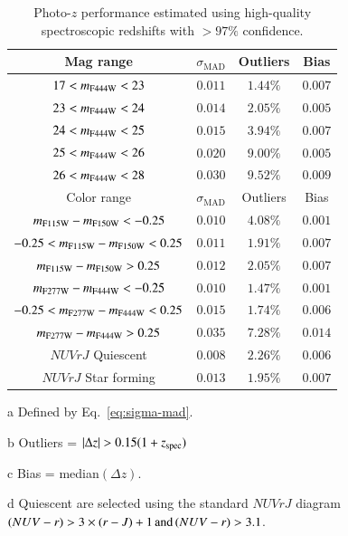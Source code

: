 \documentclass[longauth]{aa}
\begin{document}
\begin{table}[t!]
\begin{threeparttable}
\centering
\caption{Photo-$z$ performance estimated using high-quality spectroscopic redshifts with $>97\%$ confidence.}
\begin{tabular}{c|c|c|c}
\hline
\hline
Mag range & $\sigma_{\text{MAD}}$\tnote{a}  & Outliers\tnote{b} & Bias\tnote{c}  \\
\hline
$17 < m_{\rm F444W} < 23$ & $0.011$ & $1.44\%$ & $0.007$ \\
$23 < m_{\rm F444W} < 24$ & $0.014$ & $2.05\%$ & $0.005$ \\
$24 < m_{\rm F444W} < 25$ & $0.015$ & $3.94\%$ & $0.007$ \\
$25 < m_{\rm F444W} < 26$ & $0.020$ & $9.00\%$ & $0.005$ \\
$26 < m_{\rm F444W} < 28$ & $0.030$ & $9.52\%$ & $0.009$ \\
\hline
\hline
Color range & $\sigma_{\text{MAD}}$\tnote{a}  & Outliers\tnote{b} & 
Bias\tnote{c}  \\
\hline
$m_{\rm F115W} - m_{\rm F150W} < - 0.25 $ & $0.010$ & $4.08\%$ & $0.001$ \\
\hspace{-3mm} $-0.25 <m_{\rm F115W} - m_{\rm F150W} < 0.25 $ \hspace{-2mm}  & $0.011$ & $1.91\%$ & $0.007$ \\
$m_{\rm F115W} - m_{\rm F150W} > 0.25 $ & $0.012$ & $2.05\%$ & $0.007$ \\

$m_{\rm F277W} - m_{\rm F444W} < - 0.25 $ & $0.010$ & $1.47\%$ & $0.001$ \\
\hspace{-3mm} $-0.25 <m_{\rm F277W} - m_{\rm F444W} < 0.25 $ \hspace{-2mm}  & $0.015$ & $1.74\%$ & $0.006$ \\
$m_{\rm F277W} - m_{\rm F444W} > 0.25 $ & $0.035$ & $7.28\%$ & $0.014$ \\
$NUVrJ$ Quiescent\tnote{d} & $0.008$ & $2.26\%$ & $0.006$ \\
$NUVrJ$ Star forming\tnote{d} & $0.013$ & $1.95\%$ & $0.007$ \\
\hline
\end{tabular}
\begin{tablenotes}
\item[a] Defined by Eq.~\ref{eq:sigma-mad}. 
\item[b] Outliers = $|\Delta z| > 0.15 (1+z_{\rm spec})$
\item[c] Bias = median$(\Delta z)$.
\item[d] Quiescent are selected using the standard $NUVrJ$ diagram $(NUV - r) > 3\times(r - J) + 1 \, {\rm and} \, (NUV - r) > 3.1$.
\end{tablenotes}
\label{table:photoz-performance}
\end{threeparttable}
\end{table}
\end{document}

